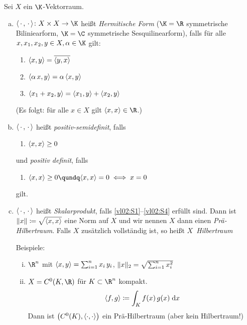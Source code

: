 \begin{thEmpty}[Skalarprodukt]
    Sei $X$ ein $\K$-Vektorraum.
    \begin{enumerate}[a)]
        \item
            $\emptySP\colon X\times X \to \K$ heißt \emph{Hermitische Form}
            ($\K=\R$ symmetrische Biliniearform, $\K=\C$ symmetrische
            Sesquilinearform), falls für alle $x,x_1,x_2,y\in X,\alpha\in\K$ gilt:
            \begin{enumerate}[({S}1),labelsep=1em,leftmargin=2cm]
                \item\label{vl02:S1}
                    $\SP{x,y} = \conj{\SP{y,x}}$
                \item\label{vl02:S2}
                    $\SP{\alpha\,x,y} = \alpha\,\SP{x,y}$
                \item\label{vl02:S3}
                    $\SP{x_1+x_2,y} = \SP{x_1,y} + \SP{x_2,y}$
            \end{enumerate}
            (Es folgt: für alle $x\in X$ gilt $\SP{x,x}\in\R$.)

        \item
            $\SP{\,\cdot\,,\,\cdot\,}$ heißt \emph{positiv-semidefinit}, falls
            \begin{enumerate}[({S}4'),labelsep=1em,leftmargin=2cm]
                \item\label{vl02:S4p}
                    $\SP{x,x} \geq 0$
            \end{enumerate}
            und \emph{positiv definit}, falls
            \begin{enumerate}[({S}4),labelsep=1em,leftmargin=2cm]
                \item\label{vl02:S4}
                    $\SP{x,x} \geq 0 \qundq \SP{x,x}=0 \iff x=0$
            \end{enumerate}
            gilt.

        \item
            $\SP{\,\cdot\,,\,\cdot\,}$ heißt \emph{Skalarprodukt}, falls 
            \ref{vl02:S1}--\ref{vl02:S4} erfüllt sind.
            Dann ist $\norm{x}\defeq\sqrt{\SP{x,x}}$ eine Norm auf $X$ und wir
            nennen $X$ dann einen \emph{Prä-Hilbertraum}.
            Falls $X$ zusätzlich vollständig ist, so heißt $X$~\emph{Hilbertraum}
            
            \pagebreak[2]
            Beispiele:
            \begin{enumerate}[i)]
                \item 
                    $\R^n$ mit $\SP{x,y} = \isum[1]^n x_i\,y_i$, 
                    $\norm{x}_2 = \sqrt{\isum[1]^n x_i^2}$
                \item
                    $X=C^0(K,\R)$ für $K\subset\R^n$ kompakt.
                    \[ \SP{f,g} \defeq \int_K f(x)\,g(x)\dif{x} \]
                    Dann ist $\bigl( C^0(K), \SP{\cdot,\cdot} \bigr)$ ein
                    Prä-Hilbertraum (aber kein Hilbertraum!)
            \end{enumerate}
    \end{enumerate}
\end{thEmpty}

